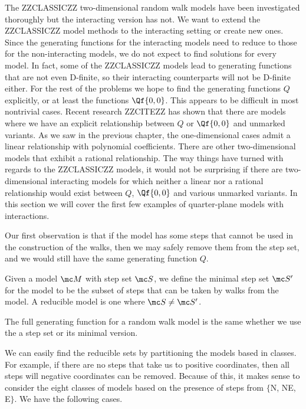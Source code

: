 The ZZCLASSICZZ two-dimensional random walk models have been investigated thoroughly but the interacting version has not. We want to extend the ZZCLASSICZZ model methods to the interacting setting or create new ones. Since the generating functions for the interacting models need to reduce to those for the non-interacting models, we do not expect to find solutions for every model. In fact, some of the ZZCLASSICZZ models lead to generating functions that are not even D-finite, so their interacting counterparts will not be D-finite either. For the rest of the problems we hope to find the generating functions $Q$ explicitly, or at least the functions $\Qf{0,0}$. This appears to be difficult in most nontrivial cases. Recent research ZZCITEZZ has shown that there are models where we have an explicit relationship between $Q$ or $\Qf{0,0}$ and unmarked variants. As we saw in the previous chapter, the one-dimensional cases admit a linear relationship with polynomial coefficients. There are other two-dimensional models that exhibit a rational relationship. The way things have turned with regards to the ZZCLASSICZZ models, it would not be surprising if there are two-dimensional interacting models for which neither a linear nor a rational relationship would exist between $Q$, $\Qf{0,0}$ and various unmarked variants. In this section we will cover the first few examples of quarter-plane models with interactions. 

Our first observation is that if the model has some steps that cannot be used in the construction of the walks, then we may safely remove them from the step set, and we would still have the same generating function $Q$.
\begin{definition}Given a model $\mc M$ with step set $\mc S$, we define the minimal step set $\mc S'$ for the model to be the subset of steps that can be taken by walks from the model. A reducible model is one where $\mc S \neq \mc S'$.
\end{definition}

\begin{lemma} The full generating function for a random walk model is the same whether we use the a step set or its minimal version.
\end{lemma}

We can easily find the reducible sets by partitioning the models based in classes. For example, if there are no steps that take us to positive coordinates, then all steps will negative coordinates can be removed. Because of this, it makes sense to consider the eight classes of models based on the presence of steps from $\{$N, NE, E$\}$. We have the following cases.

